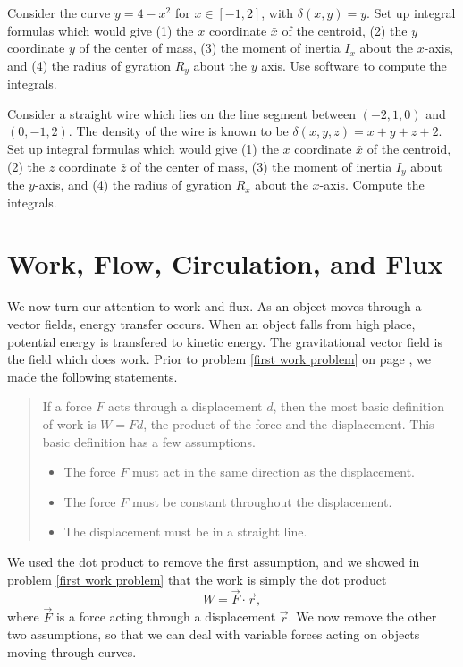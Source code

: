 \begin{problem}
Consider the curve $y=4-x^2$ for $x\in[-1,2]$, with $\delta (x,y) = y$.  Set up integral formulas which would give (1) the $x$ coordinate $\bar x$ of the centroid, (2) the $y$ coordinate $\bar y$ of the center of mass, (3) the moment of inertia $I_x$ about the $x$-axis, and (4) the radius of gyration $R_y$ about the $y$ axis. Use software to compute the integrals.
\end{problem}

\begin{problem}
 Consider a straight wire which lies on the line segment between $(-2,1,0)$ and $(0,-1,2)$. The density of the wire is known to be $\delta(x,y,z) = x+y+z+2$. Set up integral formulas which would give (1) the $x$ coordinate $\bar x$ of the centroid, (2) the $z$ coordinate $\bar z$ of the center of mass, (3) the moment of inertia $I_y$ about the $y$-axis, and (4) the radius of gyration $R_x$ about the $x$-axis. Compute the integrals.
\end{problem}




\section{Work, Flow, Circulation, and Flux}

We now turn our attention to work and flux.  As an object moves through a vector fields, energy transfer occurs.  When an object falls from high place, potential energy is transfered to kinetic energy. The gravitational vector field is the field which does work. Prior to problem \ref{first work problem} on page \pageref{first work problem}, we made the following statements. 
\begin{quote}If a force $F$ acts through a displacement $d$, then the most basic definition of work is $W=Fd$, the product of the force and the displacement.  This basic definition has a few assumptions.
\begin{itemize}
\item The force $F$ must act in the same direction as the displacement.
\item The force $F$ must be constant throughout the  displacement.
\item The displacement must be in a straight line.
\end{itemize}
\end{quote}
We used the dot product to remove the first assumption, and we showed in problem \ref{first work problem} that the work is simply the dot product $$W=\vec F\cdot \vec r,$$
where $\vec F$ is a force acting through a displacement $\vec r$. We now remove the other two assumptions, so that we can deal with variable forces acting on objects moving through curves.

